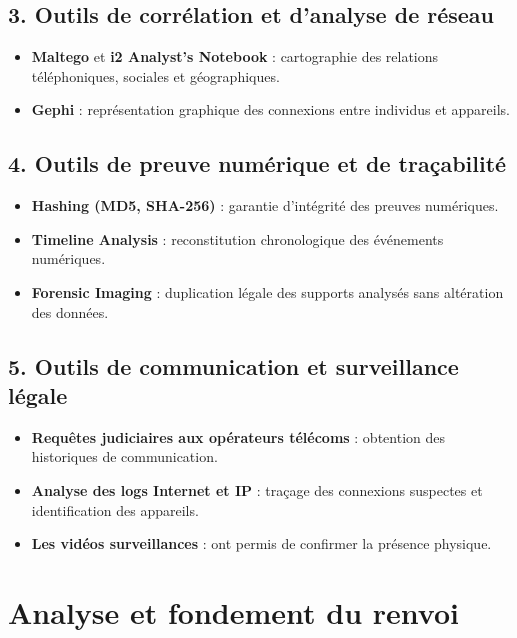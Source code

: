 \documentclass[memoire, 12pt]{report}
\begin{document}
\subsection*{3. Outils de corrélation et d’analyse de réseau}
\begin{itemize}
    \item \textbf{Maltego} et \textbf{i2 Analyst’s Notebook} : cartographie des relations téléphoniques, sociales et géographiques.
    \item \textbf{Gephi} : représentation graphique des connexions entre individus et appareils.
\end{itemize}

\subsection*{4. Outils de preuve numérique et de traçabilité}
\begin{itemize}
    \item \textbf{Hashing (MD5, SHA-256)} : garantie d’intégrité des preuves numériques.
    \item \textbf{Timeline Analysis} : reconstitution chronologique des événements numériques.
    \item \textbf{Forensic Imaging} : duplication légale des supports analysés sans altération des données.
\end{itemize}

\subsection*{5. Outils de communication et surveillance légale}
\begin{itemize}
    \item \textbf{Requêtes judiciaires aux opérateurs télécoms} : obtention des historiques de communication.
    \item \textbf{Analyse des logs Internet et IP} : traçage des connexions suspectes et identification des appareils.
    \item \textbf{Les vidéos surveillances} : ont permis de confirmer la présence physique.
\end{itemize}

\vspace{0.5cm}

\section{Analyse et fondement du renvoi}
\end{document}
